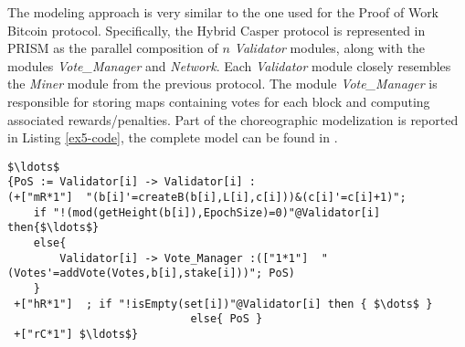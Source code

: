 The modeling approach is very similar to the one used for the Proof of Work Bitcoin protocol. Specifically, the Hybrid Casper protocol is represented in PRISM as the parallel composition of $n$ \emph{Validator} modules, along with the modules \emph{Vote\_Manager} and \emph{Network}. Each \emph{Validator} module closely resembles the \emph{Miner} module from the previous protocol. The module \emph{Vote\_Manager} is responsible for storing maps containing votes for each block and computing associated rewards/penalties.
Part of the choreographic modelization is reported in Listing \ref{ex5-code}, the complete model can be found in \cite{repository}. 
\begin{lstlisting}[style=chor-color,tabsize=2,breaklines=true, postbreak=\mbox{\textcolor{red}{$\hookrightarrow$}\space},	caption={Choreographic language for the Hybrid Casper Protocol},captionpos=b,label={ex5-code}]
$\ldots$
{PoS := Validator[i] -> Validator[i] :
(+["mR*1"]  "(b[i]'=createB(b[i],L[i],c[i]))&(c[i]'=c[i]+1)"; 
	if "!(mod(getHeight(b[i]),EpochSize)=0)"@Validator[i] then{$\ldots$}
	else{
		Validator[i] -> Vote_Manager :(["1*1"]  "(Votes'=addVote(Votes,b[i],stake[i]))"; PoS)
	}
 +["hR*1"]  ; if "!isEmpty(set[i])"@Validator[i] then { $\dots$ }
 							else{ PoS }
 +["rC*1"] $\ldots$}

\end{lstlisting}

